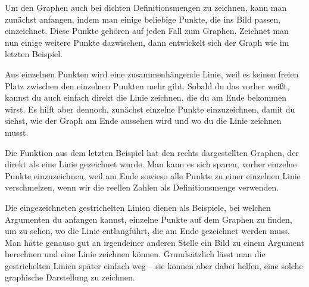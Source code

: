\documentclass[../../main.tex]{subfiles}
\begin{document}
\begin{example}{}
\begin{minipage}{\textwidth}
\begin{multicols}{3}
        \end{multicols}
    \end{minipage}
\end{example}

Um den Graphen auch bei dichten Definitionsmengen zu zeichnen, kann man zunächst anfangen, indem man einige beliebige Punkte, die ins Bild passen, einzeichnet. Diese Punkte gehören auf jeden Fall zum Graphen. Zeichnet man nun einige weitere Punkte dazwischen, dann entwickelt sich der Graph wie im letzten Beispiel.

Aus einzelnen Punkten wird eine zusammenhängende Linie, weil es keinen freien Platz zwischen den einzelnen Punkten mehr gibt. Sobald du das vorher weißt, kannst du auch einfach direkt die Linie zeichnen, die du am Ende bekommen wirst. Es hilft aber dennoch, zunächst einzelne Punkte einzuzeichnen, damit du siehst, wie der Graph am Ende aussehen wird und wo du die Linie zeichnen musst.

\begin{example}{}
    
    Die Funktion aus dem letzten Beispiel hat den rechts dargestellten Graphen, der direkt als eine Linie gezeichnet wurde. Man kann es sich sparen, vorher einzelne Punkte einzuzeichnen, weil am Ende sowieso alle Punkte zu einer einzelnen Linie verschmelzen, wenn wir die reellen Zahlen als Definitionsmenge verwenden.
    
    Die eingezeichneten gestrichelten Linien dienen als Beispiele, bei welchen Argumenten du anfangen kannst, einzelne Punkte auf dem Graphen zu finden, um zu sehen, wo die Linie entlangführt, die am Ende gezeichnet werden muss. Man hätte genauso gut an irgendeiner anderen Stelle ein Bild zu einem Argument berechnen und eine Linie zeichnen können. Grundsätzlich lässt man die gestrichelten Linien später einfach weg -- sie können aber dabei helfen, eine solche graphische Darstellung zu zeichnen.
\end{example}
\end{document}
